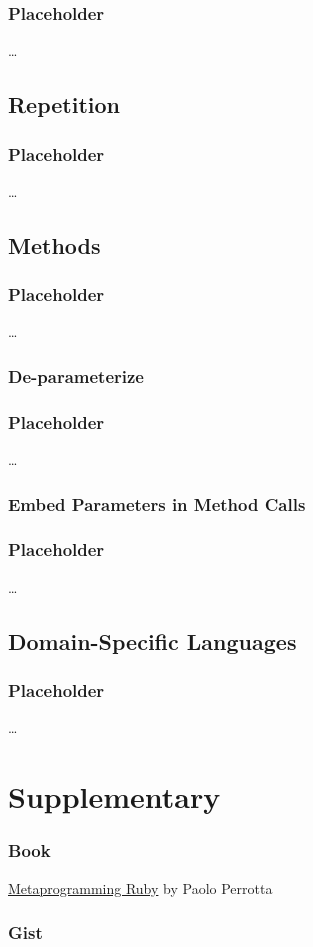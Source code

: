 \documentclass[slidestop,compress,mathserif,notes]{beamer}
\begin{document}
\begin{frame}
	\frametitle{Placeholder}
	\ldots
\end{frame}

\subsection{Repetition} %
\label{sub:repetition}

\begin{frame}
	\frametitle{Placeholder}
	\ldots
\end{frame}



\subsection{Methods} %
\label{sub:methods}

\begin{frame}
	\frametitle{Placeholder}
	\ldots
\end{frame}

\subsubsection{De-parameterize}

\begin{frame}
	\frametitle{Placeholder}
	\ldots
\end{frame}


\subsubsection{Embed Parameters in Method Calls}

\begin{frame}
	\frametitle{Placeholder}
	\ldots
\end{frame}


\subsection{Domain-Specific Languages} %
\label{sub:domain_specific_languages}
\begin{frame}
	\frametitle{Placeholder}
	\ldots
\end{frame}



\section{Supplementary} %
\label{sec:supplementary}

\begin{frame}
	\frametitle{Book}
	\underline{Metaprogramming Ruby} by Paolo Perrotta
\end{frame}

\begin{frame}
	\frametitle{Gist}
	
	
\end{frame}

\end{document}
